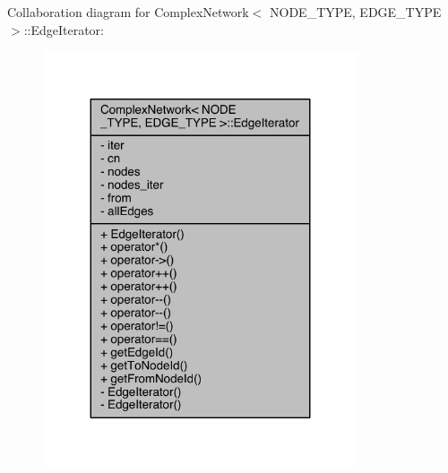 Collaboration diagram for Complex\+Network$<$ N\+O\+D\+E\+\_\+\+T\+Y\+P\+E, E\+D\+G\+E\+\_\+\+T\+Y\+P\+E $>$\+:\+:Edge\+Iterator\+:\nopagebreak
\begin{figure}[H]
\begin{center}
\leavevmode
\includegraphics[width=263pt]{class_complex_network_1_1_edge_iterator__coll__graph}
\end{center}
\end{figure}


